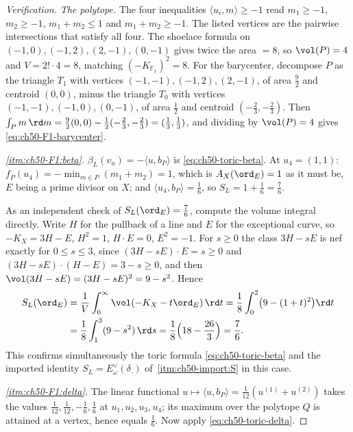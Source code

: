 \begin{proof}[Verification]
\emph{The polytope.}  The four inequalities $\langle u_i,m\rangle\ge-1$
read $m_1\ge-1$, $m_2\ge-1$, $m_1+m_2\le1$ and $m_1+m_2\ge-1$.  The
listed vertices are the pairwise intersections that satisfy all four.  The
shoelace formula on $(-1,0),(-1,2),(2,-1),(0,-1)$ gives twice the area
$=8$, so $\vol(P)=4$ and $V=2!\cdot4=8$, matching
$(-K_{\mathbb F_1})^2=8$.  For the barycenter, decompose $P$ as the
triangle $T_1$ with vertices $(-1,-1),(-1,2),(2,-1)$, of area
$\tfrac92$ and centroid $(0,0)$, minus the triangle $T_0$ with
vertices $(-1,-1),(-1,0),(0,-1)$, of area $\tfrac12$ and centroid
$(-\tfrac23,-\tfrac23)$.  Then
$\int_Pm\,\rd m=\tfrac92(0,0)-\tfrac12(-\tfrac23,-\tfrac23)
=(\tfrac13,\tfrac13)$, and dividing by $\vol(P)=4$ gives
\eqref{eq:ch50-F1-barycenter}.

\emph{\cref{itm:ch50-F1:beta}.}  $\beta_L(v_u)=-\langle u,b_P\rangle$ is
\eqref{eq:ch50-toric-beta}.  At $u_4=(1,1)$:
$f_P(u_4)=-\min_{m\in P}(m_1+m_2)=1$, which is $A_X(\ord_E)=1$ as it
must be, $E$ being a prime divisor on $X$; and
$\langle u_4,b_P\rangle=\tfrac16$, so $S_L=1+\tfrac16=\tfrac76$.

As an independent check of $S_L(\ord_E)=\tfrac76$, compute the volume
integral directly.  Write $H$ for the pullback of a line and
$E$ for the exceptional curve, so $-K_X=3H-E$, $H^2=1$,
$H\cdot E=0$, $E^2=-1$.  For $s\ge0$ the class $3H-sE$ is nef
exactly for $0\le s\le3$, since $(3H-sE)\cdot E=s\ge0$ and
$(3H-sE)\cdot(H-E)=3-s\ge0$, and then
$\vol(3H-sE)=(3H-sE)^2=9-s^2$.  Hence
\[
 \begin{split}
 S_L(\ord_E)
 &=\frac1V\int_0^\infty\vol(-K_X-t\ord_E)\,\rd t
  =\frac18\int_0^2\bigl(9-(1+t)^2\bigr)\rd t\\
 &=\frac18\int_1^3(9-s^2)\,\rd s
  =\frac18\Bigl(18-\frac{26}{3}\Bigr)=\frac76 .
 \end{split}
\]
This confirms simultaneously the toric formula
\eqref{eq:ch50-toric-beta} and the imported identity
$S_L=E^\vee_\omega(\delta_\cdot)$ of
\,\cref{itm:ch50-import:S} in this case.

\emph{\cref{itm:ch50-F1:delta}.}  The linear functional
$u\mapsto\langle u,b_P\rangle=\tfrac1{12}(u^{(1)}+u^{(2)})$ takes the
values $\tfrac1{12},\tfrac1{12},-\tfrac16,\tfrac16$ at
$u_1,u_2,u_3,u_4$; its maximum over the polytope $Q$ is attained at a
vertex, hence equals $\tfrac16$.  Now apply
\eqref{eq:ch50-toric-delta}.


\end{proof}
